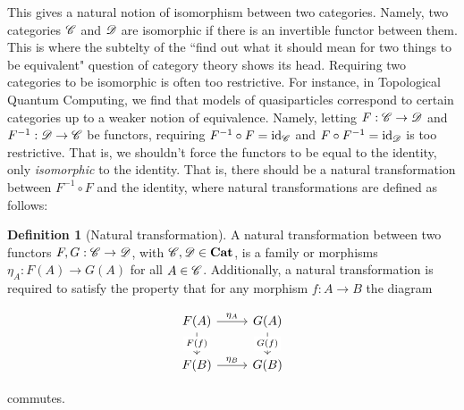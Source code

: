 \documentclass{article}
\theoremstyle{definition}
\newtheorem*{definition}{Definition}
\numberwithin{figure}{section}
\begin{document}
This gives a natural notion of isomorphism between two categories. Namely, two categories $\mathscr{C}$ and $\mathscr{D}$ are isomorphic if there is an invertible functor between them. This is where the subtelty of the ``find out what it should mean for two things to be equivalent" question of category theory shows its head. Requiring two categories to be isomorphic is often too restrictive. For instance, in Topological Quantum Computing, we find that models of quasiparticles correspond to certain categories up to a weaker notion of equivalence. Namely, letting $F:\mathscr{C} \to \mathscr{D}$ and $F^{-1}:\mathscr{D} \to \mathscr{C}$ be functors, requiring $F^{-1}\circ F=\mathrm{id}_{\mathscr{C}}$ and $F\circ F^{-1}=\mathrm{id}_{\mathscr{D}}$ is too restrictive. That is, we shouldn't force the functors to be equal to the identity, only \textit{isomorphic} to the identity. That is, there should be a natural transformation between $F^{-1}\circ F$ and the identity, where natural transformations are defined as follows:

\begin{definition}[Natural transformation] A natural transformation between two functors $F,G: \mathscr{C}\to \mathscr{D}$, with $\mathscr{C},\mathscr{D}\in \bold{Cat}$, is a family or morphisms $\eta_A: F(A)\to G(A)$ for all $A\in \mathscr{C}$. Additionally, a natural transformation is required to satisfy the property that for any morphism $f:A\to B$ the diagram

\[\begin{tikzcd}
	{F(A)} & {G(A)} \\
	{F(B)} & {G(B)}
	\arrow["{\eta_B}", from=2-1, to=2-2]
	\arrow["{\eta_A}", from=1-1, to=1-2]
	\arrow["{F(f)}"{description}, from=1-1, to=2-1]
	\arrow["{G(f)}"{description}, from=1-2, to=2-2]
\end{tikzcd}\]

commutes.

\raggedleft\qedsymbol{}
\end{definition}
\end{document}
